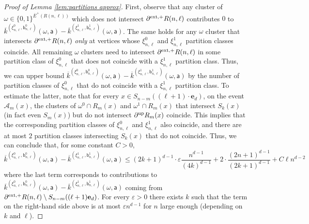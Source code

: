 \documentclass[11pt,a4paper]{article}
\numberwithin{equation}{section}
\theoremstyle{plain}
\theoremstyle{definition}
\begin{document}
\begin{proof}[Proof of Lemma \textup{\ref{lem:partitions approx}}]
First, observe that any cluster of $\omega \in \{0,1\}^{\overline{E}^+(R(n,\ell))}$ which does not intersect $\partial^{\textup{ext},+} R(n,\ell)$ contributes $0$ to $
\overline{k}^{(\xi^0_{n,\ell},\mathsf{b}^0_{n,\ell})}(\omega,\mathsf{a}) - \overline{k}^{(\xi^1_{n,\ell},\mathsf{b}^1_{n,\ell})}(\omega,\mathsf{a})$. The same holds for any $\omega$ cluster that intersects $\partial^{\textup{ext},+} R(n,\ell)$ \emph{only} at vertices whose $\xi^0_{n,\ell}$ and $\xi^1_{n,\ell}$ partition classes coincide. 
All remaining $\omega$ clusters need to intersect $\partial^{\textup{ext},+} R(n,\ell)$ in some partition class of $\xi^0_{n,\ell}$ that does not coincide with a $\xi^1_{n,\ell}$ partition class. 
Thus, we can upper bound $
\overline{k}^{(\xi^0_{n,\ell},\mathsf{b}^0_{n,\ell})}(\omega,\mathsf{a}) - \overline{k}^{(\xi^1_{n,\ell},\mathsf{b}^1_{n,\ell})}(\omega,\mathsf{a})$ by the number of partition classes of $\xi^0_{n,\ell}$ that do not coincide with a $\xi^1_{n,\ell}$ partition class. 
To estimate the latter, note that for every $x\in S_{n-m}((\ell+1)\cdot \mathbf e_d)$, on the event $\mathcal{A}_m(x)$, the clusters of $\omega^0\cap R_m(x)$ and $\omega^1\cap R_m(x)$ that intersect $S_k(x)$ (in fact even $S_m(x)$) but do not intersect $\partial^{\textup{up}}R_m(x)$ coincide. 
This implies that the corresponding partition classes of $\xi^0_{n,\ell}$ and $\xi^1_{n,\ell}$ also coincide, and there are at most $2$ partition classes intersecting $S_k(x)$ that do not coincide. Thus, we can conclude that, for some constant $C>0$,
\begin{equation}
\overline{k}^{(\xi^0_{n,\ell},\mathsf{b}^0_{n,\ell})}(\omega,\mathsf{a}) - \overline{k}^{(\xi^1_{n,\ell},\mathsf{b}^1_{n,\ell})}(\omega,\mathsf{a})\le (2k+1)^{d-1}\cdot\varepsilon  \frac{n^{d-1}}{(4k)^{d-1}}+2\cdot\frac{(2n+1)^{d-1}}{(2k+1)^{d-1}}+C\ell n^{d-2}
\end{equation}
where the last term corresponds to contributions to $
\overline{k}^{(\xi^0_{n,\ell},\mathsf{b}^0_{n,\ell})}(\omega,\mathsf{a}) - \overline{k}^{(\xi^1_{n,\ell},\mathsf{b}^1_{n,\ell})}(\omega,\mathsf{a})$ coming from $\partial^{\textup{ext},+}R(n,\ell)\setminus S_{n-m}((\ell+1)\mathbf e_d)$. For every $\varepsilon>0$ there exists $k$ such that the term on the right-hand side above is at most $\varepsilon n^{d-1}$ for $n$ large enough (depending on $k$ and $\ell$).
\end{proof}
\end{document}
